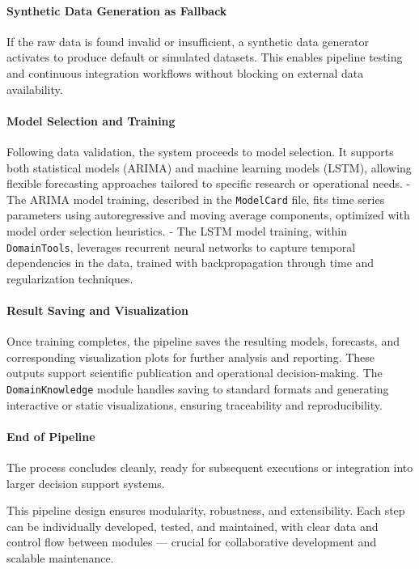 \paragraph{Synthetic Data Generation as Fallback}  
If the raw data is found invalid or insufficient, a synthetic data generator activates to produce default or simulated datasets. This enables pipeline testing and continuous integration workflows without blocking on external data availability.

\paragraph{Model Selection and Training}  
Following data validation, the system proceeds to model selection. It supports both statistical models (ARIMA) and machine learning models (LSTM), allowing flexible forecasting approaches tailored to specific research or operational needs.  
- The ARIMA model training, described in the \texttt{ModelCard} file, fits time series parameters using autoregressive and moving average components, optimized with model order selection heuristics.  
- The LSTM model training, within \texttt{DomainTools}, leverages recurrent neural networks to capture temporal dependencies in the data, trained with backpropagation through time and regularization techniques.

\paragraph{Result Saving and Visualization}  
Once training completes, the pipeline saves the resulting models, forecasts, and corresponding visualization plots for further analysis and reporting. These outputs support scientific publication and operational decision-making. The \texttt{DomainKnowledge} module handles saving to standard formats and generating interactive or static visualizations, ensuring traceability and reproducibility.

\paragraph{End of Pipeline}  
The process concludes cleanly, ready for subsequent executions or integration into larger decision support systems.


This pipeline design ensures modularity, robustness, and extensibility. Each step can be individually developed, tested, and maintained, with clear data and control flow between modules — crucial for collaborative development and scalable maintenance.





